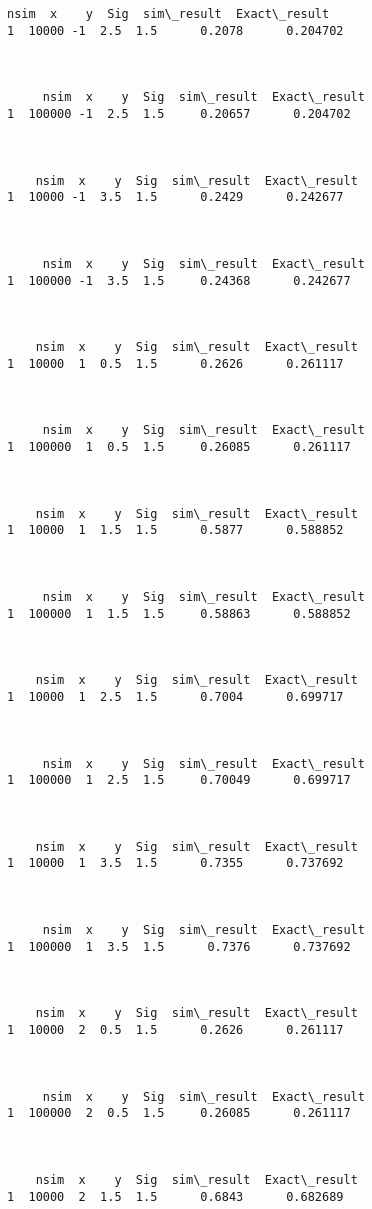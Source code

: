 \documentclass[12pt]{article}
\begin{document}
\begin{Verbatim}[commandchars=\\\{\}]
    nsim  x    y  Sig  sim\_result  Exact\_result
1  10000 -1  2.5  1.5      0.2078      0.204702



     nsim  x    y  Sig  sim\_result  Exact\_result
1  100000 -1  2.5  1.5     0.20657      0.204702



    nsim  x    y  Sig  sim\_result  Exact\_result
1  10000 -1  3.5  1.5      0.2429      0.242677



     nsim  x    y  Sig  sim\_result  Exact\_result
1  100000 -1  3.5  1.5     0.24368      0.242677



    nsim  x    y  Sig  sim\_result  Exact\_result
1  10000  1  0.5  1.5      0.2626      0.261117



     nsim  x    y  Sig  sim\_result  Exact\_result
1  100000  1  0.5  1.5     0.26085      0.261117



    nsim  x    y  Sig  sim\_result  Exact\_result
1  10000  1  1.5  1.5      0.5877      0.588852



     nsim  x    y  Sig  sim\_result  Exact\_result
1  100000  1  1.5  1.5     0.58863      0.588852



    nsim  x    y  Sig  sim\_result  Exact\_result
1  10000  1  2.5  1.5      0.7004      0.699717



     nsim  x    y  Sig  sim\_result  Exact\_result
1  100000  1  2.5  1.5     0.70049      0.699717



    nsim  x    y  Sig  sim\_result  Exact\_result
1  10000  1  3.5  1.5      0.7355      0.737692



     nsim  x    y  Sig  sim\_result  Exact\_result
1  100000  1  3.5  1.5      0.7376      0.737692



    nsim  x    y  Sig  sim\_result  Exact\_result
1  10000  2  0.5  1.5      0.2626      0.261117



     nsim  x    y  Sig  sim\_result  Exact\_result
1  100000  2  0.5  1.5     0.26085      0.261117



    nsim  x    y  Sig  sim\_result  Exact\_result
1  10000  2  1.5  1.5      0.6843      0.682689




\end{Verbatim}
\end{document}
